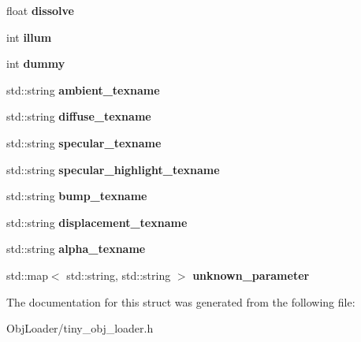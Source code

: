 \begin{DoxyCompactItemize}
float {\bfseries dissolve}
\item 
\mbox{\label{structtinyobj_1_1material__t_af846245315bd70c1a4f815dfdd6b80cc}} 
int {\bfseries illum}
\item 
\mbox{\label{structtinyobj_1_1material__t_a6b1814d1066609178c81d2a4f7b34bd8}} 
int {\bfseries dummy}
\item 
\mbox{\label{structtinyobj_1_1material__t_ae988eed637f368374becbb672798a45e}} 
std\+::string {\bfseries ambient\+\_\+texname}
\item 
\mbox{\label{structtinyobj_1_1material__t_ad7f71a301a261fca07d2e50edccc792d}} 
std\+::string {\bfseries diffuse\+\_\+texname}
\item 
\mbox{\label{structtinyobj_1_1material__t_aed8c38d64472ba0db5186dba800b1b34}} 
std\+::string {\bfseries specular\+\_\+texname}
\item 
\mbox{\label{structtinyobj_1_1material__t_a5c0e981297646f1fc1aeba616692c41b}} 
std\+::string {\bfseries specular\+\_\+highlight\+\_\+texname}
\item 
\mbox{\label{structtinyobj_1_1material__t_aceb73086232f1cdd82f956fe8c6efcfb}} 
std\+::string {\bfseries bump\+\_\+texname}
\item 
\mbox{\label{structtinyobj_1_1material__t_ab69842db3e67cc7d4dcd8bfe02590f92}} 
std\+::string {\bfseries displacement\+\_\+texname}
\item 
\mbox{\label{structtinyobj_1_1material__t_a1b0225fd76de506f089fdedbf2c66dec}} 
std\+::string {\bfseries alpha\+\_\+texname}
\item 
\mbox{\label{structtinyobj_1_1material__t_a18b700227c94d410ed1aa550c7fa9226}} 
std\+::map$<$ std\+::string, std\+::string $>$ {\bfseries unknown\+\_\+parameter}
\end{DoxyCompactItemize}


The documentation for this struct was generated from the following file\+:\begin{DoxyCompactItemize}
\item 
Obj\+Loader/tiny\+\_\+obj\+\_\+loader.\+h\end{DoxyCompactItemize}
